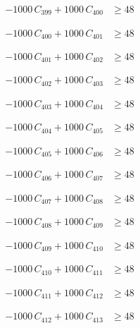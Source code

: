 \documentclass[a4paper,11pt]{article}
\begin{document}
\begin{align}
-1000\,C_{399} + 1000\,C_{400} &\geq 48 \nonumber
\end{align}

\begin{align}
-1000\,C_{400} + 1000\,C_{401} &\geq 48 \nonumber
\end{align}

\begin{align}
-1000\,C_{401} + 1000\,C_{402} &\geq 48 \nonumber
\end{align}

\begin{align}
-1000\,C_{402} + 1000\,C_{403} &\geq 48 \nonumber
\end{align}

\begin{align}
-1000\,C_{403} + 1000\,C_{404} &\geq 48 \nonumber
\end{align}

\begin{align}
-1000\,C_{404} + 1000\,C_{405} &\geq 48 \nonumber
\end{align}

\begin{align}
-1000\,C_{405} + 1000\,C_{406} &\geq 48 \nonumber
\end{align}

\begin{align}
-1000\,C_{406} + 1000\,C_{407} &\geq 48 \nonumber
\end{align}

\begin{align}
-1000\,C_{407} + 1000\,C_{408} &\geq 48 \nonumber
\end{align}

\begin{align}
-1000\,C_{408} + 1000\,C_{409} &\geq 48 \nonumber
\end{align}

\begin{align}
-1000\,C_{409} + 1000\,C_{410} &\geq 48 \nonumber
\end{align}

\begin{align}
-1000\,C_{410} + 1000\,C_{411} &\geq 48 \nonumber
\end{align}

\begin{align}
-1000\,C_{411} + 1000\,C_{412} &\geq 48 \nonumber
\end{align}

\begin{align}
-1000\,C_{412} + 1000\,C_{413} &\geq 48 \nonumber
\end{align}
\end{document}
